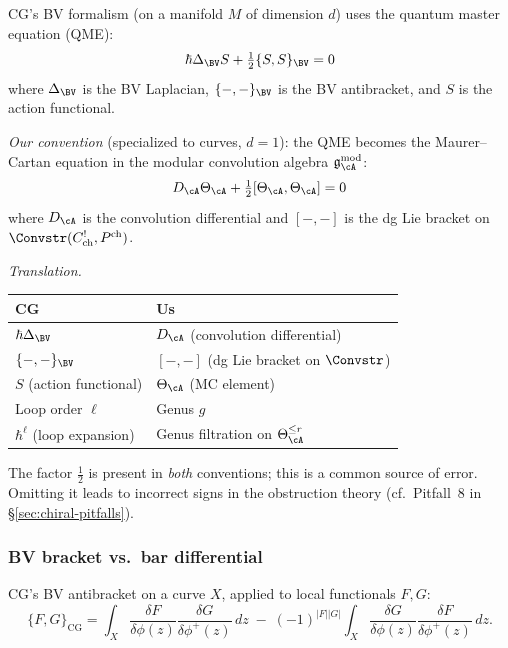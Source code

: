 CG's BV formalism (on a manifold $M$ of dimension $d$) uses the quantum
master equation (QME):
\begin{equation}\label{eq:qme-cg}
\hbar \Delta_{\BV} S + \tfrac{1}{2}\{S, S\}_{\BV} = 0
\end{equation}
where $\Delta_{\BV}$ is the BV Laplacian, $\{-,-\}_{\BV}$ is the BV antibracket,
and $S$ is the action functional.

\emph{Our convention} (specialized to curves, $d=1$): the QME becomes the
Maurer--Cartan equation in the modular convolution algebra
$\mathfrak{g}^{\mathrm{mod}}_\cA$:
\begin{equation}\label{eq:mc-us}
D_\cA \Theta_\cA + \tfrac{1}{2}[\Theta_\cA, \Theta_\cA] = 0
\end{equation}
where $D_\cA$ is the convolution differential and $[-,-]$ is the dg Lie bracket
on $\Convstr(C^!_{\mathrm{ch}}, P^{\mathrm{ch}})$.

\emph{Translation.}
\begin{center}
\begin{tabular}{|l|l|}
\hline
\textbf{CG} & \textbf{Us} \\
\hline
$\hbar \Delta_{\BV}$ & $D_\cA$ (convolution differential) \\
$\{-,-\}_{\BV}$ & $[-,-]$ (dg Lie bracket on $\Convstr$) \\
$S$ (action functional) & $\Theta_\cA$ (MC element) \\
Loop order $\ell$ & Genus $g$ \\
$\hbar^\ell$ (loop expansion) & Genus filtration on $\Theta_\cA^{\leq r}$ \\
\hline
\end{tabular}
\end{center}

The factor $\frac{1}{2}$ is present in \emph{both} conventions; this is a
common source of error. Omitting it leads to incorrect signs in the
obstruction theory (cf.\ Pitfall~8 in \S\ref{sec:chiral-pitfalls}).

\subsubsection{BV bracket vs.\ bar differential}

CG's BV antibracket on a curve $X$, applied to local functionals $F, G$:
\[
\{F, G\}_{\mathrm{CG}} = \int_X \frac{\delta F}{\delta \phi(z)} \frac{\delta G}{\delta \phi^+(z)}\, dz
 \;-\; (-1)^{|F||G|} \int_X \frac{\delta G}{\delta \phi(z)} \frac{\delta F}{\delta \phi^+(z)}\, dz.
\]

